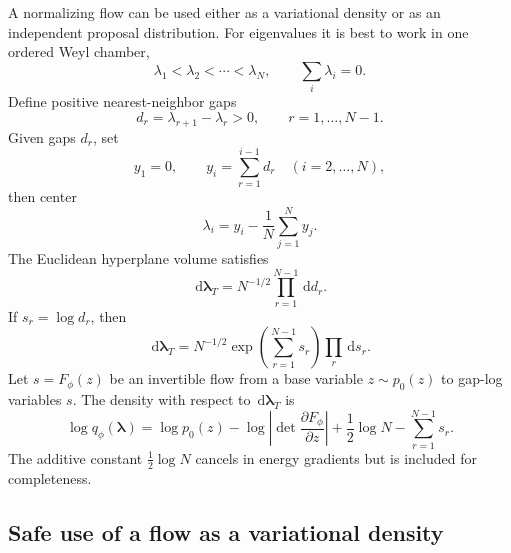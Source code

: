 \documentclass[11pt]{article}
\newcommand{\dd}{\,\mathrm d}
\begin{document}
A normalizing flow can be used either as a variational density or as an independent proposal distribution.  For eigenvalues it is best to work in one ordered Weyl chamber,
\begin{equation}
\lambda_1<\lambda_2<\cdots<\lambda_N,
\qquad
\sum_i\lambda_i=0.
\end{equation}
Define positive nearest-neighbor gaps
\begin{equation}
d_r=\lambda_{r+1}-\lambda_r>0,
\qquad r=1,\ldots,N-1.
\end{equation}
Given gaps $d_r$, set
\begin{equation}
y_1=0,
\qquad
y_i=\sum_{r=1}^{i-1}d_r\quad (i=2,\ldots,N),
\end{equation}
then center
\begin{equation}
\lambda_i=y_i-\frac1N\sum_{j=1}^Ny_j.
\end{equation}
The Euclidean hyperplane volume satisfies
\begin{equation}
\boxed{
\dd\bm\lambda_T=N^{-1/2}\prod_{r=1}^{N-1}\dd d_r.
}
\label{eq:gap_jacobian_d}
\end{equation}
If $s_r=\log d_r$, then
\begin{equation}
\dd\bm\lambda_T=N^{-1/2}\exp\left(\sum_{r=1}^{N-1}s_r\right)\prod_r\dd s_r.
\end{equation}
Let $s=F_\phi(z)$ be an invertible flow from a base variable $z\sim p_0(z)$ to gap-log variables $s$.  The density with respect to $\dd\bm\lambda_T$ is
\begin{equation}
\boxed{
\log q_\phi(\bm\lambda)
=\log p_0(z)-\log\left|\det\frac{\partial F_\phi}{\partial z}\right|
+\frac12\log N-
\sum_{r=1}^{N-1}s_r.
}
\label{eq:flow_density_gap}
\end{equation}
The additive constant $\frac12\log N$ cancels in energy gradients but is included for completeness.

\subsection{Safe use of a flow as a variational density}
\end{document}

